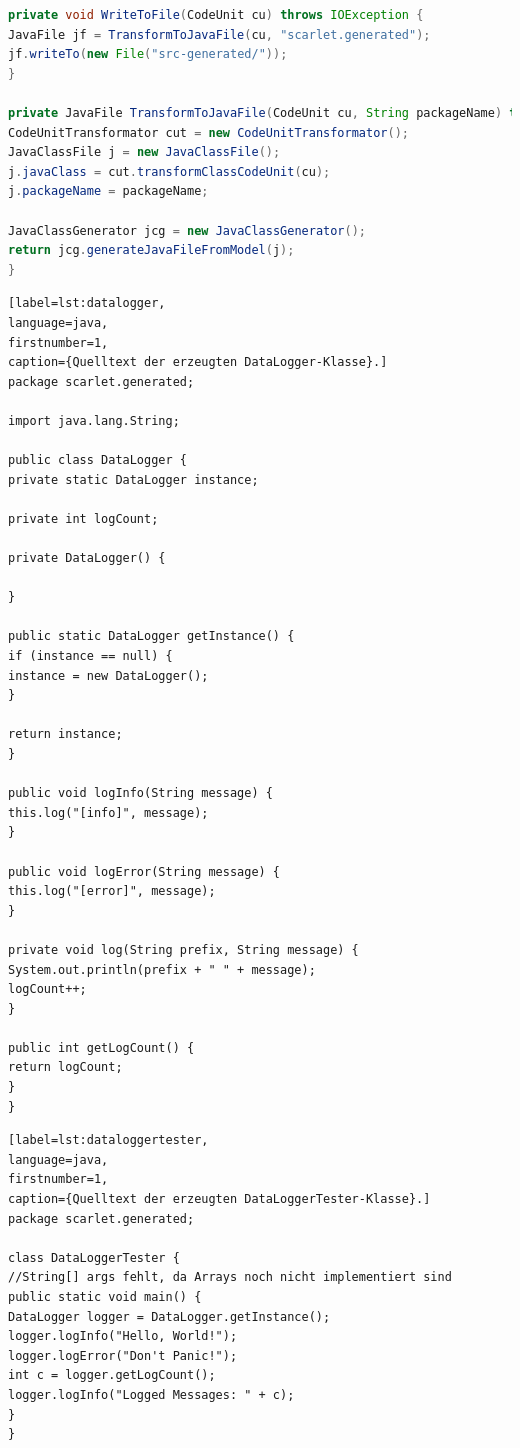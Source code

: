 \documentclass[12pt,oneside,a4paper,parskip]{scrbook}
\begin{document}
\begin{lstlisting}[label=lst:dataloggergen,
language=java,
firstnumber=1,
caption=Quelltext zur Erzeugung des DataLoggers und des zugehörigen Testers.]
private void WriteToFile(CodeUnit cu) throws IOException {
JavaFile jf = TransformToJavaFile(cu, "scarlet.generated");
jf.writeTo(new File("src-generated/"));
}

private JavaFile TransformToJavaFile(CodeUnit cu, String packageName) throws IOException {
CodeUnitTransformator cut = new CodeUnitTransformator();
JavaClassFile j = new JavaClassFile();
j.javaClass = cut.transformClassCodeUnit(cu);
j.packageName = packageName;

JavaClassGenerator jcg = new JavaClassGenerator();
return jcg.generateJavaFileFromModel(j);
}
\end{lstlisting}

\begin{lstlisting}[label=lst:datalogger,
language=java,
firstnumber=1,
caption={Quelltext der erzeugten DataLogger-Klasse}.]
package scarlet.generated;

import java.lang.String;

public class DataLogger {
private static DataLogger instance;

private int logCount;

private DataLogger() {

}

public static DataLogger getInstance() {
if (instance == null) {
instance = new DataLogger();
}

return instance;
}

public void logInfo(String message) {
this.log("[info]", message);
}

public void logError(String message) {
this.log("[error]", message);
}

private void log(String prefix, String message) {
System.out.println(prefix + " " + message);
logCount++;
}

public int getLogCount() {
return logCount;
}
}
\end{lstlisting}

\begin{lstlisting}[label=lst:dataloggertester,
language=java,
firstnumber=1,
caption={Quelltext der erzeugten DataLoggerTester-Klasse}.]
package scarlet.generated;

class DataLoggerTester {
//String[] args fehlt, da Arrays noch nicht implementiert sind
public static void main() {
DataLogger logger = DataLogger.getInstance();
logger.logInfo("Hello, World!");
logger.logError("Don't Panic!");
int c = logger.getLogCount();
logger.logInfo("Logged Messages: " + c);
}
}
\end{lstlisting}
\end{document}

